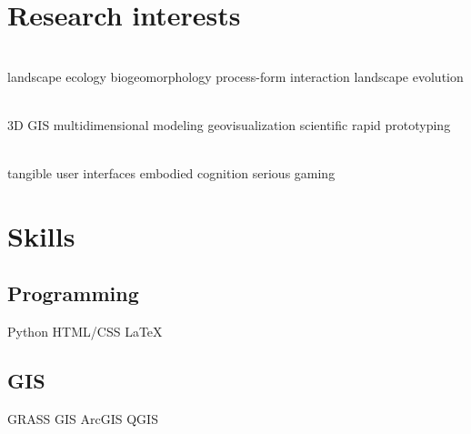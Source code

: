 \documentclass[]{baharmon_cv}
\begin{document}
{{{{{\section{Research interests}

\vspace*{0.2cm}
 \\ \vspace*{0.1cm}
\normalsize{
landscape ecology \textbullet{} biogeomorphology \textbullet{} process-form interaction \textbullet{} landscape evolution}
\\
\vspace*{0.2cm}

 \vspace{0.1em} \\ \vspace*{0.1cm}
\normalsize{
3D GIS \textbullet{} multidimensional modeling \textbullet{} geovisualization \textbullet{} scientific rapid prototyping}
\\
\vspace*{0.2cm}

 \vspace{0.1em} \\ \vspace*{0.1cm}
\normalsize{
tangible user interfaces \textbullet{} embodied cognition \textbullet{} serious gaming}
\\

\sectiondivider



\section{Skills}
\normalsize{
\begin{minipage}[t]{0.3\textwidth} 
\subsection{Programming}
\vspace*{0.1cm}
Python \textbullet{} HTML/CSS \textbullet{} \LaTeX\ \\ 
\linespread{0.1}
%
\subsection{GIS}
\vspace*{0.1cm}
GRASS GIS \textbullet{} ArcGIS \textbullet{} QGIS \\ 
\linespread{0.1}
%

\end{minipage}}}}}}}
\end{document}
